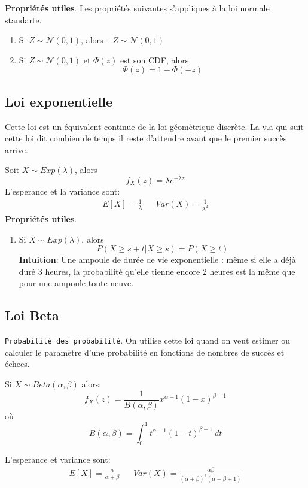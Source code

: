 \documentclass[a4paper]{article}
\begin{document}
\textbf{Propriétés utiles}.
Les propriétés suivantes s'appliques à la loi normale standarte.
\begin{enumerate}
    \item Si $Z \sim \mathcal{N}(0, 1)$, alors  $-Z \sim \mathcal{N}(0, 1)$ 
    \item Si $Z \sim \mathcal{N}(0, 1)$ et  $\Phi(z)$ est son CDF, alors
         \[
        \Phi(z) = 1 - \Phi(-z)
        \] 
\end{enumerate}

\subsection{Loi exponentielle}
Cette loi est un équivalent continue de la loi géomètrique discrète.
La v.a qui suit cette loi dit combien de temps il reste d'attendre avant que le
premier succès arrive.

Soit $X \sim Exp(\lambda)$, alors
 \[
     f_X(z) = \lambda e^{-\lambda z}
\] 
L'esperance et la variance sont:
\begin{align*}
    E[X] = \frac{1}{\lambda} & & Var(X) = \frac{1}{\lambda^2}
\end{align*}
\textbf{Propriétés utiles}.
\begin{enumerate}
    \item Si $X \sim Exp(\lambda)$, alors
         \[
        P(X \ge s + t | X \ge s) = P(X \ge t)
        \] 
        \textbf{Intuition}: Une ampoule de durée de vie exponentielle :
        même si elle a déjà duré 3 heures, la probabilité qu’elle tienne
        encore 2 heures est la même que pour une ampoule toute neuve.
\end{enumerate}

\subsection{Loi Beta}
\texttt{Probabilité des probabilité}. On utilise cette loi quand on veut
estimer ou calculer le paramètre d'une probabilité en fonctions de nombres de
succès et échecs.

Si $X \sim Beta(\alpha, \beta)$ alors:
\[
    f_X(z) = \frac{1}{B(\alpha, \beta)}x^{\alpha-1}(1 - x)^{\beta - 1}
\] 
où
\[
    B(\alpha, \beta) = \int_{{0}}^{{1}} {t^{\alpha-1} (1-t)^{\beta - 1}} \: d{t} {}
\] 

L'esperance et variance sont:
 \begin{align*}
     E[X] = \frac{\alpha}{\alpha + \beta} & & Var(X) = \frac{\alpha \beta}{(\alpha + \beta)^2 (\alpha + \beta + 1)}
\end{align*}
\end{document}
